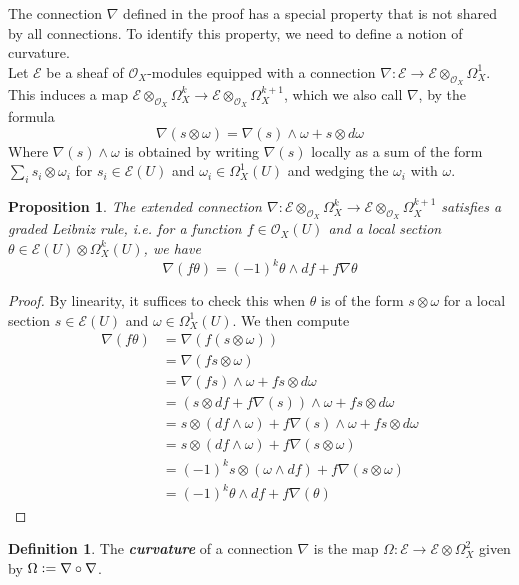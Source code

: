 \documentclass[psamsfonts, 12pt]{amsart}
\newtheorem{prop}[thm]{Proposition}
\theoremstyle{definition}
\newtheorem{defn}[thm]{Definition}
\theoremstyle{remark}
\renewcommand{\O}{\mathcal{O}}
\newcommand{\ib}[1]{\textbf{\textit{#1}}}
\newcommand{\defeq}{\vcentcolon=}
\begin{document}
%
The connection $\nabla$ defined in the proof has a special property that
is not shared by all connections. To identify this property, we need to define
a notion of curvature. \\

Let $\mathcal{E}$ be a sheaf of $\O_X$-modules equipped with a connection
$\nabla : \mathcal{E} \to \mathcal{E} \otimes_{\O_X} \Omega^1_X$. This induces a map
$\mathcal{E} \otimes_{\O_X} \Omega^k_X \to \mathcal{E} \otimes_{\O_X} \Omega^{k+1}_X$,
which we also call $\nabla$, by the formula
\[
\nabla(s \otimes \omega) = \nabla(s) \wedge \omega + s \otimes d\omega
\]
Where $\nabla(s) \wedge \omega$ is obtained by writing $\nabla(s)$ locally as a sum
of the form $\sum_i s_i \otimes \omega_i$ for $s_i \in \mathcal{E}(U)$ and
$\omega_i \in \Omega^1_X(U)$ and wedging the $\omega_i$ with $\omega$.
%
\begin{prop}
The extended connection
$\nabla:\mathcal{E}\otimes_{\O_X}\Omega^k_X \to \mathcal{E}\otimes_{\O_X}\Omega^{k+1}_X$
satisfies a graded Leibniz rule, i.e. for a function $f \in \O_X(U)$ and a local
section $\theta \in \mathcal{E}(U) \otimes \Omega^k_X(U)$, we have
\[
\nabla(f\theta) = (-1)^k \theta \wedge df + f\nabla\theta
\]
\end{prop}
%
\begin{proof}
By linearity, it suffices to check this when $\theta$ is of the form $s \otimes \omega$
for a local section $s \in \mathcal{E}(U)$ and $\omega \in \Omega^1_X(U)$. We then
compute
\begin{align*}
\nabla(f\theta) &= \nabla(f(s\otimes\omega)) \\
&= \nabla(fs \otimes \omega) \\
&= \nabla(fs) \wedge \omega + fs \otimes d\omega \\
&= (s \otimes df + f\nabla(s))\wedge \omega + fs \otimes d\omega \\
&= s \otimes(df\wedge\omega) + f\nabla(s)\wedge\omega + fs\otimes d\omega \\
&= s \otimes (df \wedge \omega) + f\nabla(s \otimes \omega) \\
&= (-1)^k s\otimes(\omega \wedge df) + f\nabla(s\otimes\omega) \\
&= (-1)^k \theta\wedge df + f\nabla(\theta)
\end{align*}
\end{proof}
%
\begin{defn}
The \ib{curvature} of a connection $\nabla$ is the map
$\Omega : \mathcal{E} \to \mathcal{E} \otimes \Omega^2_X$ given by
$\Omega \defeq \nabla \circ \nabla$.
\end{defn}
\end{document}
